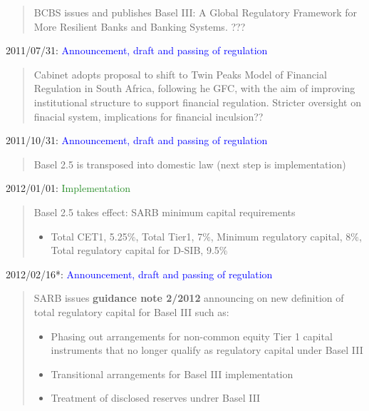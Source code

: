 \documentclass[
  letterpaper,
  DIV=11,
  numbers=noendperiod]{scrartcl}
\begin{document}
\begin{quote}BCBS issues and publishes Basel III: A Global Regulatory Framework for More Resilient Banks and Banking Systems. ???
\end{quote}

2011/07/31:
\textcolor{blue}{Announcement, draft and passing of regulation}

\begin{quote} 
Cabinet adopts proposal to shift to Twin Peaks Model of Financial Regulation in South Africa, following he GFC, with the aim of improving  institutional structure to support financial regulation. Stricter oversight on finacial system, implications for financial inculsion??
\end{quote}

2011/10/31:
\textcolor{blue}{Announcement, draft and passing of regulation}

\begin{quote}
Basel 2.5 is transposed into domestic law (next step is implementation)
\end{quote}

2012/01/01: \textcolor{ForestGreen}{Implementation}

\begin{quote}
    Basel 2.5 takes effect: SARB minimum capital requirements
    \begin{itemize}
        \item Total CET1, 5.25\%, Total Tier1, 7\%, Minimum regulatory capital, 8\%, Total regulatory capital for D-SIB, 9.5\%
    \end{itemize}
\end{quote}

2012/02/16*:
\textcolor{blue}{Announcement, draft and passing of regulation}

\begin{quote}
SARB issues \textbf{guidance note 2/2012} announcing on new definition of total regulatory capital for Basel III such as:
\begin{itemize}
    \item Phasing out arrangements for non-common equity Tier 1 capital instruments that no longer qualify as regulatory capital under Basel III
 \item Transitional arrangements for Basel III implementation
\item Treatment of disclosed reserves undrer Basel III
\end{itemize}
\end{quote}
\end{document}
